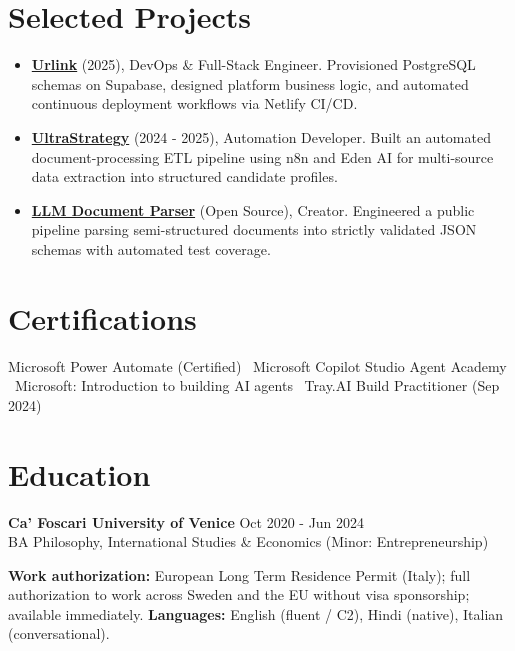 \documentclass[a4paper,10pt]{article}
\begin{document}
\section{Selected Projects}
\begin{itemize}
 \item \textbf{\href{https://smarturlink.com/}{Urlink}} (2025), DevOps \& Full-Stack Engineer. Provisioned PostgreSQL schemas on Supabase, designed platform business logic, and automated continuous deployment workflows via Netlify CI/CD.
 \item \textbf{\href{https://ultrastrategy.com}{UltraStrategy}} (2024 - 2025), Automation Developer. Built an automated document-processing ETL pipeline using n8n and Eden AI for multi-source data extraction into structured candidate profiles.
 \item \textbf{\href{https://github.com/prab-gupta/llm-doc-parser}{LLM Document Parser}} (Open Source), Creator. Engineered a public pipeline parsing semi-structured documents into strictly validated JSON schemas with automated test coverage.
\end{itemize}

\section{Certifications}
Microsoft Power Automate (Certified) \textbullet\ Microsoft Copilot Studio Agent Academy \textbullet\ Microsoft: Introduction to building AI agents \textbullet\ Tray.AI Build Practitioner (Sep 2024)

\section{Education}
\textbf{Ca' Foscari University of Venice} \hfill Oct 2020 - Jun 2024\\
BA Philosophy, International Studies \& Economics (Minor: Entrepreneurship)

\vspace{2pt}
{\small \textbf{Work authorization:} European Long Term Residence Permit (Italy); full authorization to work across Sweden and the EU without visa sponsorship; available immediately. \quad \textbf{Languages:} English (fluent / C2), Hindi (native), Italian (conversational).}
\end{document}
